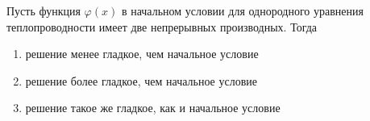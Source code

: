 Пусть функция \(\varphi (x)\) в начальном условии для однородного уравнения теплопроводности имеет две непрерывных производных. Тогда

\begin{enumerate}[label=\arabic*)]
    \item решение менее гладкое, чем начальное условие
    \item решение более гладкое, чем начальное условие
    \item решение такое же гладкое, как и начальное условие
\end{enumerate}

